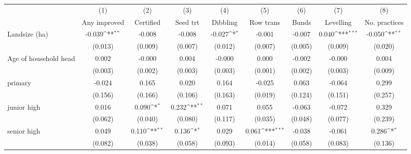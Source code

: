 {
\def\sym#1{\ifmmode^{#1}\else\(^{#1}\)\fi}
\begin{tabular}{l*{8}{c}}
\hline\hline
                    &\multicolumn{1}{c}{(1)}         &\multicolumn{1}{c}{(2)}         &\multicolumn{1}{c}{(3)}         &\multicolumn{1}{c}{(4)}         &\multicolumn{1}{c}{(5)}         &\multicolumn{1}{c}{(6)}         &\multicolumn{1}{c}{(7)}         &\multicolumn{1}{c}{(8)}         \\
                    &Any improved         &Certified         &Seed trt         &Dibbling         &Row trans         &Bunds         &Levelling         &No. practices         \\
\hline
Landsize (ha)       &-0.039\sym{**} &-0.008         &-0.008         &-0.027\sym{*}  &-0.001         &-0.007         &0.040\sym{***}&-0.050\sym{**} \\
                    &(0.013)         &(0.009)         &(0.007)         &(0.012)         &(0.007)         &(0.005)         &(0.009)         &(0.020)         \\
Age of household head&0.002         &-0.000         &0.004         &-0.000         &0.000         &-0.002         &-0.000         &0.004         \\
                    &(0.003)         &(0.002)         &(0.003)         &(0.003)         &(0.001)         &(0.002)         &(0.003)         &(0.009)         \\
primary             &-0.024         &0.165         &0.020         &0.164         &-0.025         &0.063         &-0.064         &0.299         \\
                    &(0.156)         &(0.166)         &(0.106)         &(0.163)         &(0.019)         &(0.124)         &(0.151)         &(0.257)         \\
junior high         &0.016         &0.090\sym{*}  &0.232\sym{**} &0.071         &0.055         &-0.063         &-0.072         &0.329         \\
                    &(0.062)         &(0.040)         &(0.080)         &(0.117)         &(0.035)         &(0.048)         &(0.077)         &(0.239)         \\
senior high         &0.049         &0.110\sym{**} &0.136\sym{*}  &0.029         &0.061\sym{***}&-0.038         &-0.061         &0.286\sym{*}  \\
                    &(0.082)         &(0.038)         &(0.058)         &(0.093)         &(0.014)         &(0.058)         &(0.083)         &(0.136)         \\

\end{tabular}}

